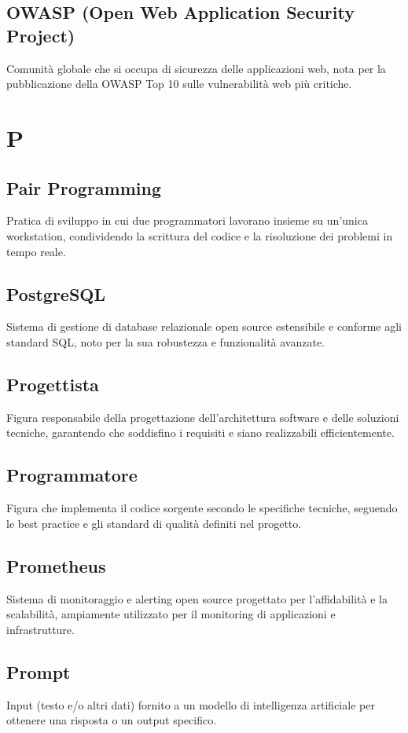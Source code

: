 \documentclass[a4paper,11pt]{article}
\begin{document}
\subsection{OWASP (Open Web Application Security Project)}
Comunità globale che si occupa di sicurezza delle applicazioni web, nota per la pubblicazione della OWASP Top 10 sulle vulnerabilità web più critiche.

\newpage
\section{P}

\subsection{Pair Programming}
Pratica di sviluppo in cui due programmatori lavorano insieme su un'unica workstation, condividendo la scrittura del codice e la risoluzione dei problemi in tempo reale.

\subsection{PostgreSQL}
Sistema di gestione di database relazionale open source estensibile e conforme agli standard SQL, noto per la sua robustezza e funzionalità avanzate.

\subsection{Progettista}
Figura responsabile della progettazione dell'architettura software e delle soluzioni tecniche, garantendo che soddisfino i requisiti e siano realizzabili efficientemente.

\subsection{Programmatore}
Figura che implementa il codice sorgente secondo le specifiche tecniche, seguendo le best practice e gli standard di qualità definiti nel progetto.

\subsection{Prometheus}
Sistema di monitoraggio e alerting open source progettato per l'affidabilità e la scalabilità, ampiamente utilizzato per il monitoring di applicazioni e infrastrutture.

\subsection{Prompt}
Input (testo e/o altri dati) fornito a un modello di intelligenza artificiale per ottenere una risposta o un output specifico.
\end{document}
